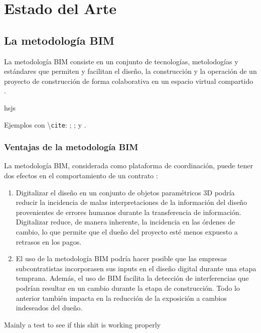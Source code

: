 \chapter{Estado del Arte}

\section{La metodología BIM}

La metodología BIM consiste en un conjunto de tecnologías, metolodogías y estándares que permiten y facilitan el diseño, la construcción y la operación de un proyecto de construcción de forma colaborativa en un espacio virtual compartido \cite{tabilo2019estudio}.

hsjs


Ejemplos con \textbackslash \texttt{cite}: ; \cite{lu2014cost};  y .

\subsection{Ventajas de la metodología BIM}

La metodología BIM, considerada como plataforma de coordinación, puede tener dos efectos en el comportamiento de un contrato \cite{chang2014economic}: 
\begin{enumerate}
    \item Digitalizar el diseño en un conjunto de objetos paramétricos 3D podría reducir la incidencia de malas interpretaciones de la información del diseño provenientes de errores humanos durante la transferencia de información. Digitalizar reduce, de manera inherente, la incidencia en las órdenes de cambio, lo que permite que el dueño del proyecto esté menos expuesto a retrasos en los pagos.
    \item El uso de la metodología BIM podría hacer posible que las empresas subcontratistas incorporasen sus inputs en el diseño digital durante una etapa temprana. Además, el uso de BIM facilita la detección de interferencias que podrían resultar en un cambio durante la etapa de construcción. Todo lo anterior también impacta en la reducción de la exposición a cambios indeseados del dueño.
\end{enumerate}


Mainly a test to see if this shit is working properly